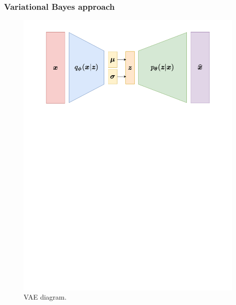\subsubsection{Variational Bayes approach}
\begin{figure}[h]
	\centering
	\includegraphics[width=\textwidth, trim={0 19cm 0 0cm}]{plots/Images/VAE_diagram.pdf}
	\caption{VAE diagram.}%
	\label{fig:VAE_architecture}%
\end{figure}


